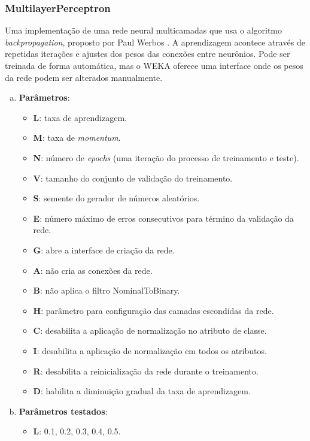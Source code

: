 \subsubsection{MultilayerPerceptron}

Uma implementação de uma rede neural multicamadas que usa o algoritmo \emph{backpropagation}, proposto por Paul Werbos \cite{Werbos1974}. A aprendizagem acontece através de repetidas iterações e ajustes dos pesos das conexões entre neurônios. Pode ser treinada de forma automática, mas o WEKA oferece uma interface onde os pesos da rede podem ser alterados manualmente.

\begin{enumerate}[a)]
    \item \textbf{Parâmetros}:
        \begin{itemize}
            \item \textbf{L}: taxa de aprendizagem.
            \item \textbf{M}: taxa de \emph{momentum}.
            \item \textbf{N}: número de \emph{epochs} (uma iteração do processo de treinamento e teste).
            \item \textbf{V}: tamanho do conjunto de validação do treinamento.
            \item \textbf{S}: semente do gerador de números aleatórios.
            \item \textbf{E}: número máximo de erros consecutivos para término da validação da rede.
            \item \textbf{G}: abre a interface de criação da rede.
            \item \textbf{A}: não cria as conexões da rede.
            \item \textbf{B}: não aplica o filtro NominalToBinary.
            \item \textbf{H}: parâmetro para configuração das camadas escondidas da rede.
            \item \textbf{C}: desabilita a aplicação de normalização no atributo de classe.
            \item \textbf{I}: desabilita a aplicação de normalização em todos os atributos.
            \item \textbf{R}: desabilita a reinicialização da rede durante o treinamento.
            \item \textbf{D}: habilita a diminuição gradual da taxa de aprendizagem.
        \end{itemize}
    \item \textbf{Parâmetros testados}:
        \begin{itemize}
            \item \textbf{L}: 0.1, 0.2, 0.3, 0.4, 0.5.
        \end{itemize}
\end{enumerate}

